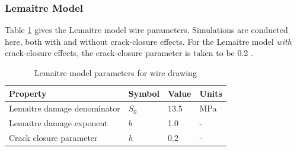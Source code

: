 \documentclass[sn-mathphys,Numbered]{sn-jnl}%
\begin{document}
\subsubsection{Lemaitre Model}
Table \ref{tab:lemaitre_wire_draw_mat} gives the Lemaitre model wire parameters.
Simulations are conducted here, both with and without crack-closure effects.
For the Lemaitre model \emph{with} crack-closure effects, the crack-closure parameter is taken to be 0.2 \cite{desmorat_modeling_2008, lemaitre_course_1996, bouchard_enhanced_2011}.
\begin{table}[htb]
	\centering
		\begin{tabular}{llll} \hline
			Property & Symbol & Value & Units \\ \hline 
			Lemaitre damage denominator & $S_0$ & $13.5$ & MPa  \\
			Lemaitre damage exponent & $b$ & 1.0 & - \\
			Crack closure parameter & $h$ & 0.2 & -\\
			\hline
		\end{tabular}
	\caption{Lemaitre model parameters for wire drawing}
	\label{tab:lemaitre_wire_draw_mat}
\end{table}
\end{document}

